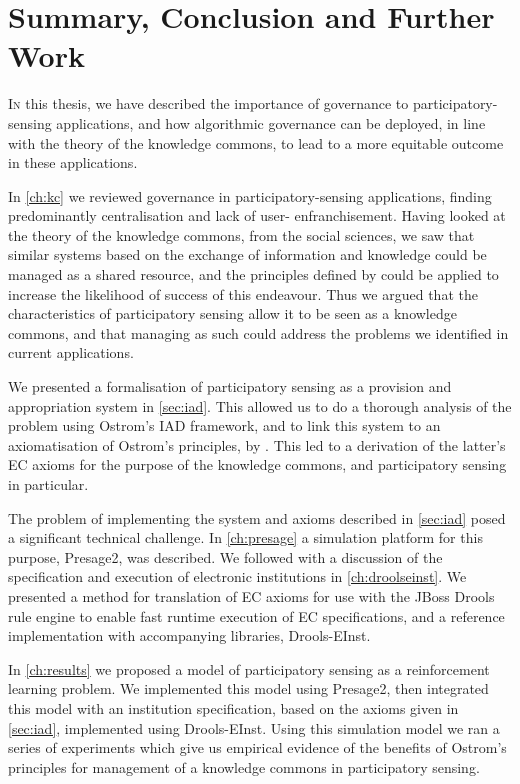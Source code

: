 \acresetall
\chapter{Summary, Conclusion and Further Work}

\lettrine[lines=3]{I}{n} this thesis, we have described the importance of
governance to participatory-sensing applications, and how algorithmic
governance can be deployed, in line with the theory of the knowledge commons,
to lead to a more equitable outcome in these applications.

In \autoref{ch:kc} we reviewed governance in participatory-sensing
applications, finding predominantly centralisation and lack of user-
enfranchisement. Having looked at the theory of the knowledge commons, from
the social sciences, we saw that similar systems based on the exchange of
information and knowledge could be managed as a shared resource, and the
principles defined by \citet{Ostrom1990} could be applied to increase the
likelihood of success of this endeavour. Thus we argued that the
characteristics of participatory sensing allow it to be seen as a knowledge
commons, and that managing as such could address the problems we identified in
current applications.

We presented a formalisation of participatory sensing as a provision and
appropriation system in \autoref{sec:iad}. This allowed us to do a thorough
analysis of the problem using Ostrom's \ac{IAD} framework, and to link this
system to an axiomatisation of Ostrom's principles, by \citet{Pitt2012b}. This
led to a derivation of the latter's \ac{EC} axioms for the purpose of the
knowledge commons, and participatory sensing in particular.

The problem of implementing the system and axioms described in
\autoref{sec:iad} posed a significant technical challenge. In
\autoref{ch:presage} a simulation platform for this purpose, Presage2, was
described. We followed with a discussion of the specification and execution of
electronic institutions in \autoref{ch:droolseinst}. We presented a method for
translation of \ac{EC} axioms for use with the JBoss Drools rule engine to
enable fast runtime execution of \ac{EC} specifications, and a reference
implementation with accompanying libraries, Drools-EInst.

In \autoref{ch:results} we proposed a model of participatory sensing as a
reinforcement learning problem. We implemented this model using Presage2, then
integrated this model with an institution specification, based on the axioms
given in \autoref{sec:iad}, implemented using Drools-EInst. Using this
simulation model we ran a series of experiments which give us empirical
evidence of the benefits of Ostrom's principles for management of a knowledge
commons in participatory sensing.

